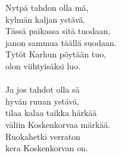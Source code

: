 
            Nytpä tahdon olla mä, \\
            kylmän kaljan ystävä. \\
            Tässä paikassa sitä tuodaan, \\
            janon sammua täällä suodaan. \\
            Tytöt Karhun pöytään tuo, \\
            olon viihtyisäksi luo. \\
\hspace{10mm} \\
            Ja jos tahdot olla sä \\
            hyvän ruuan ystävä, \\
            tilaa kalaa taikka härkää \\
            väliin Koskenkorvaa märkää. \\
            Ruokahetki verraton \\
            kera Koskenkorvan on. \\
